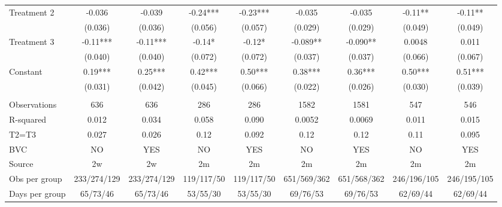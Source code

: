 \begin{tabular}{lcccccccc}
\midrule
\midrule
Treatment 2 & -0.036 & -0.039 & -0.24*** & -0.23*** & -0.035 & -0.035 & -0.11** & -0.11** \\
      & (0.036) & (0.036) & (0.056) & (0.057) & (0.029) & (0.029) & (0.049) & (0.049) \\
Treatment 3 & -0.11*** & -0.11*** & -0.14* & -0.12* & -0.089** & -0.090** & 0.0048 & 0.011 \\
      & (0.040) & (0.040) & (0.072) & (0.072) & (0.037) & (0.037) & (0.066) & (0.067) \\
Constant  & 0.19*** & 0.25*** & 0.42*** & 0.50*** & 0.38*** & 0.36*** & 0.50*** & 0.51*** \\
      & (0.031) & (0.042) & (0.045) & (0.066) & (0.022) & (0.026) & (0.030) & (0.039) \\
      &       &       &       &       &       &       &       &  \\
\midrule
Observations & 636   & 636   & 286   & 286   & 1582  & 1581  & 547   & 546 \\
R-squared & 0.012 & 0.034 & 0.058 & 0.090 & 0.0052 & 0.0069 & 0.011 & 0.015 \\
T2=T3 & 0.027 & 0.026 & 0.12  & 0.092 & 0.12  & 0.12  & 0.11  & 0.095 \\
BVC   & NO    & YES   & NO    & YES   & NO    & YES   & NO    & YES \\
Source & 2w    & 2w    & 2m    & 2m    & 2m    & 2m    & 2m    & 2m \\
Obs per group & 233/274/129 & 233/274/129 & 119/117/50 & 119/117/50 & 651/569/362 & 651/568/362 & 246/196/105 & 246/195/105 \\
Days per group & 65/73/46 & 65/73/46 & 53/55/30 & 53/55/30 & 69/76/53 & 69/76/53 & 62/69/44 & 62/69/44 \\
\bottomrule
\bottomrule
\end{tabular}%
